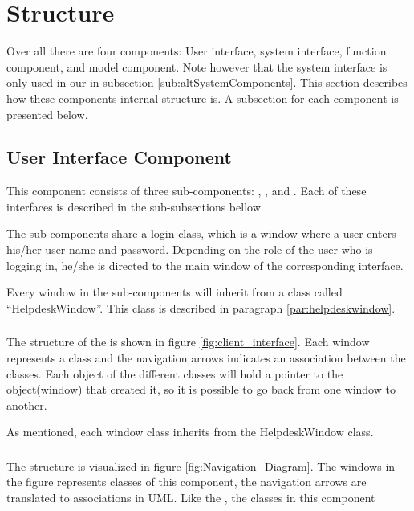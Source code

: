 \section{Structure}
Over all there are four components: User interface, system interface, function component, and model component.
Note however that the system interface is only used in our  in subsection \ref{sub:altSystemComponents}.
This section describes how these components internal structure is.
A subsection for each component is presented below.

\subsection{User Interface Component}
This component consists of three sub-components: \cinterface[], \sinterface[], and \ainterface[].
Each of these interfaces is described in the sub-subsections bellow.

The sub-components share a login class, which is a window where a user enters his/her user name and password.
Depending on the role of the user who is logging in, he/she is directed to the main window of the corresponding interface.

Every window in the sub-components will inherit from a class called ``HelpdeskWindow''.
This class is described in paragraph \ref{par:helpdeskwindow}.

\subsubsection{\cinterface[]}
The structure of the \cinterface[] is shown in figure \ref{fig:client_interface}.
Each window represents a class and the navigation arrows indicates an association between the classes.
Each object of the different classes will hold a pointer to the object(window) that created it, so it is possible to go back from one window to another.

As mentioned, each window class inherits from the HelpdeskWindow class.

\subsubsection{\sinterface[]}
The \sinterface[] structure is visualized in figure \ref{fig:Navigation_Diagram}.
The windows in the figure represents classes of this component, the navigation arrows are translated to associations in UML.
Like the \cinterface[], the classes in this component

